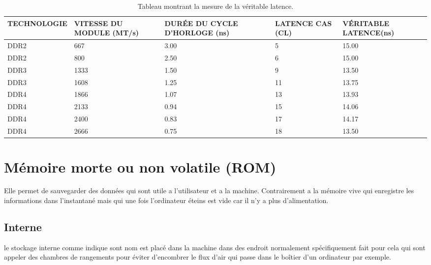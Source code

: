\documentclass[a4paper,12pt]{article}
\begin{document}
        \begin{table}[h!]
        \begin{centering}
            \begin{tabular}{|C{3cm}|C{3cm}|C{3cm}|C{3cm}|C{3cm}|}
                \hline {} TECHNOLOGIE & VITESSE DU MODULE (MT/s) & DURÉE DU CYCLE D'HORLOGE (ns) & LATENCE CAS (CL) & VÉRITABLE LATENCE(ns) \\
                \hline {} DDR2 & 667 & 3.00 & 5 & 15.00 \\
                \hline  DDR2 & 800 & 2.50 & 6 & 15.00 \\
                \hline {} DDR3 & 1333 & 1.50 & 9 & 13.50 \\
                \hline  DDR3 & 1608 & 1.25 & 11 & 13.75 \\
                \hline {} DDR4 & 1866 & 1.07 & 13 & 13.93 \\
                \hline  DDR4 & 2133 & 0.94 & 15 & 14.06 \\
                \hline {} DDR4 & 2400 & 0.83 & 17 & 14.17 \\
                \hline  DDR4 & 2666 & 0.75 & 18 & 13.50 \\
                \hline
            \end{tabular}
            \caption{Tableau montrant la mesure de la véritable latence. \citep{site1}}
            \label{fig:Tableau montrant la mesure de la véritable latence.}
        \end{centering}
        \end{table}
    
    
    \newpage
    
    \section{Mémoire morte ou non volatile (ROM)\protect\footnotemark[1]}
        Elle permet de sauvegarder des données qui sont utile a l'utilisateur et a la machine. Contrairement a la mémoire vive qui enregistre les informations dans l'instantané mais qui une fois l'ordinateur éteins est vide car il n'y a plus d'alimentation.
        
        \subsection{Interne}
            le stockage interne comme indique sont nom est placé dans la machine dans des endroit normalement spécifiquement fait pour cela qui sont appeler des chambres de rangements pour éviter d’encombrer le flux d'air qui passe dans le boîtier d'un ordinateur par exemple.\\
            
\end{document}
